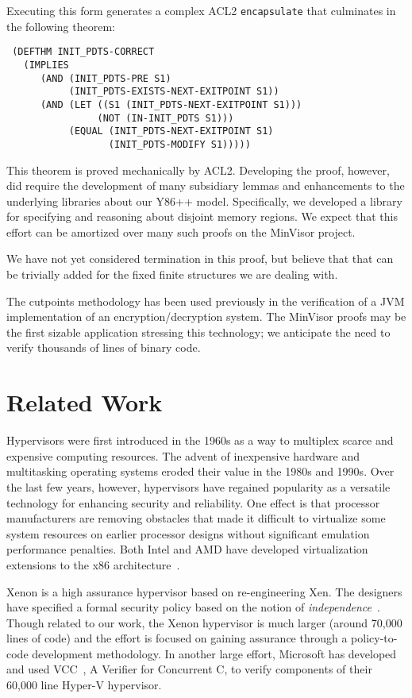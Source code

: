 \documentclass[submission,copyright]{eptcs} \providecommand{\event}{ACL2 2011}
\begin{document}
Executing this form generates a complex ACL2 {\tt encapsulate} that
culminates in the following theorem: 
\begin{verbatim}
 (DEFTHM INIT_PDTS-CORRECT
   (IMPLIES 
      (AND (INIT_PDTS-PRE S1)
           (INIT_PDTS-EXISTS-NEXT-EXITPOINT S1))
      (AND (LET ((S1 (INIT_PDTS-NEXT-EXITPOINT S1)))
                (NOT (IN-INIT_PDTS S1)))
           (EQUAL (INIT_PDTS-NEXT-EXITPOINT S1)
                  (INIT_PDTS-MODIFY S1)))))
\end{verbatim}
This theorem is proved mechanically by ACL2.  Developing the proof,
however, did require the development of many subsidiary lemmas and
enhancements to the underlying libraries about our Y86++ model.
Specifically, we developed a library for specifying and reasoning
about disjoint memory regions.  We expect that this effort can be
amortized over many such proofs on the MinVisor project.

We have not yet considered termination in this proof, but believe that
that can be trivially added for the fixed finite structures we are
dealing with.


The cutpoints methodology has been used previously
\cite{ACL2cutpoints} in the verification of a JVM implementation of an
encryption/decryption system.  The MinVisor proofs may be the first
sizable application stressing this technology; we anticipate the need
to verify thousands of lines of binary code. 

\section{Related Work}
\label{Related Work}

Hypervisors were first introduced in the 1960s as a way to multiplex
scarce and expensive computing resources.  The advent of inexpensive
hardware and multitasking operating systems eroded their value in the
1980s and 1990s.  Over the last few years, however, hypervisors have
regained popularity as a versatile technology for enhancing security
and reliability.  One effect is that processor manufacturers are
removing obstacles that made it difficult to virtualize some system
resources on earlier processor designs without significant emulation
performance penalties.  Both Intel and AMD have developed
virtualization extensions to the x86 architecture~\cite{AMD,Intel}.

Xenon\cite{McDermott08,XenonPolicy} is a high assurance hypervisor
based on re-engineering Xen.  The designers have specified a formal
security policy based on the notion of
\textit{independence}~\cite{Roscoe}.  Though related to our work, the
Xenon hypervisor is much larger (around 70,000 lines of code) and the
effort is focused on gaining assurance through a policy-to-code
develop\-ment meth\-odology. In another large effort, Microsoft has developed
and used VCC~\cite{VCC}, A Verifier for Concurrent C, to verify components
of their 60,000 line Hyper-V hypervisor.
\end{document}
